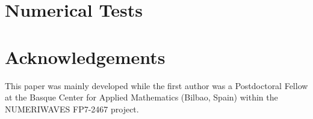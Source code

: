 \documentclass{elsarticle}
\begin{document}
  \section{Numerical Tests} \label{sec:Tests}
  

  \section*{Acknowledgements}
  This paper was mainly developed while the first author was a Postdoctoral
  Fellow at the Basque Center for Applied Mathematics (Bilbao, Spain) within the
  NUMERIWAVES FP7-2467 project.

  
  
\end{document}
